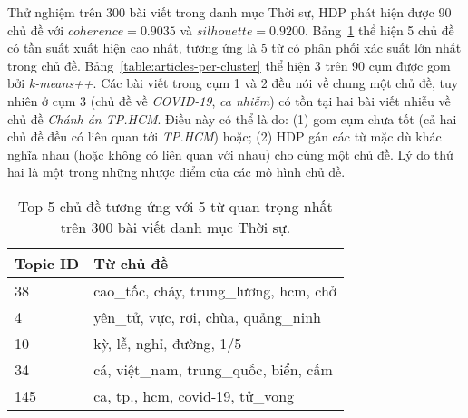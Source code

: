 Thử nghiệm trên 300 bài viết trong danh mục Thời sự, HDP phát hiện được 90 chủ đề với $coherence=0.9035$ và $silhouette=0.9200$. Bảng~\ref{table:top-topics} thể hiện 5 chủ đề có tần suất xuất hiện cao nhất, tương ứng là 5 từ có phân phối xác suất lớn nhất trong chủ đề. Bảng~\ref{table:articles-per-cluster} thể hiện 3 trên 90 cụm được gom bởi \textit{k-means++}. Các bài viết trong cụm 1 và 2 đều nói về chung một chủ đề, tuy nhiên ở cụm 3 (chủ đề về \textit{COVID-19}, \textit{ca nhiễm}) có tồn tại hai bài viết nhiễu về chủ đề \textit{Chánh án TP.HCM}. Điều này có thể là do: (1) gom cụm chưa tốt (cả hai chủ đề đều có liên quan tới \textit{TP.HCM}) hoặc; (2) HDP gán các từ mặc dù khác nghĩa nhau (hoặc không có liên quan với nhau) cho cùng một chủ đề. Lý do thứ hai là một trong những nhược điểm của các mô hình chủ đề.

\begin{table}[ht!]
    \centering
    \begin{tabular}{|l|l|}
    \hline
    \textbf{Topic ID} & \textbf{Từ chủ đề}            \\ \hline
    38       & cao\_tốc, cháy, trung\_lương, hcm, chở \\ \hline
    4        & yên\_tử, vực, rơi, chùa, quảng\_ninh   \\ \hline
    10       & kỳ, lễ, nghỉ, đường, 1/5               \\ \hline
    34       & cá, việt\_nam, trung\_quốc, biển, cấm  \\ \hline
    145      & ca, tp., hcm, covid-19, tử\_vong       \\ \hline
    \end{tabular}
    \caption{Top 5 chủ đề tương ứng với 5 từ quan trọng nhất trên 300 bài viết danh mục Thời sự.}
    \label{table:top-topics}
\end{table}

